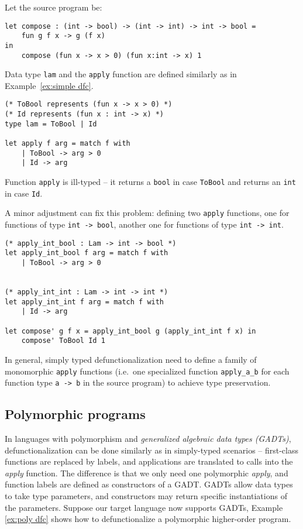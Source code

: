 \begin{exmp}
\label{ex:illtype dfc}
Let the source program be:
\begin{lstlisting}
let compose : (int -> bool) -> (int -> int) -> int -> bool =
    fun g f x -> g (f x)
in 
    compose (fun x -> x > 0) (fun x:int -> x) 1
\end{lstlisting}
Data type \texttt{lam} and the \texttt{apply} function are defined similarly as in Example~\ref{ex:simple dfc}.
\begin{lstlisting}
(* ToBool represents (fun x -> x > 0) *)
(* Id represents (fun x : int -> x) *)
type lam = ToBool | Id

let apply f arg = match f with
    | ToBool -> arg > 0
    | Id -> arg
\end{lstlisting}
Function \texttt{apply} is ill-typed -- it returns a \texttt{bool} in case \texttt{ToBool} and returns an \texttt{int} in case \texttt{Id}.
\end{exmp}

A minor adjustment can fix this problem: defining two \texttt{apply} functions, one for functions of type \texttt{int -> bool}, another one for functions of type \texttt{int -> int}.

\begin{lstlisting}
(* apply_int_bool : Lam -> int -> bool *)
let apply_int_bool f arg = match f with
	| ToBool -> arg > 0


(* apply_int_int : Lam -> int -> int *)
let apply_int_int f arg = match f with
	| Id -> arg

let compose' g f x = apply_int_bool g (apply_int_int f x) in
    compose' ToBool Id 1
\end{lstlisting}

In general, simply typed defunctionalization need to define a family of monomorphic \texttt{apply} functions (i.e.~one specialized function \texttt{apply\_a\_b} for each function type \texttt{a -> b} in the source program) to achieve type preservation.

\subsection{Polymorphic programs}

In languages with polymorphism and \textit{generalized algebraic data types (GADTs)}, defunctionalization can be done similarly as in simply-typed scenarios – first-class functions are replaced by labels, and applications are translated to calls into the \textit{apply} function. The difference is that we only need one polymorphic \textit{apply}, and function labels are defined as constructors of a GADT. GADTs allow data types to take type parameters, and constructors may return specific instantiations of the parameters. Suppose our target language now supports GADTs, Example \ref{ex:poly dfc} shows how to defunctionalize a polymorphic higher-order program.

